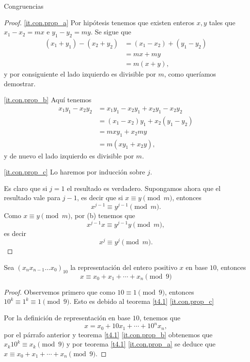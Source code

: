 \begin{section}{Congruencias}
\begin{proof}
\ref{it.con.prop_a} Por hipótesis tenemos que existen enteros
$x,y$ tales que $x_1-x_2=mx$ e $y_1-y_2=my$. Se sigue que
$$
\begin{aligned}
(x_1+y_1)-(x_2+y_2) &= (x_1-x_2)+ (y_1 -y_2) \\
&= mx +my \\
&= m(x+y),
\end{aligned}
$$
y por consiguiente el lado izquierdo es divisible por $m$, como
queríamos demostrar.

\ref{it.con.prop_b} Aquí tenemos
$$
\begin{aligned}
x_1y_1-x_2y_2 &=  x_1y_1-x_2y_1+ x_2y_1-x_2y_2 \\
&= (x_1-x_2)y_1+ x_2(y_1 -y_2) \\
&= mxy_1 +x_2my \\
&= m(xy_1+x_2y),
\end{aligned}
$$
y de nuevo el lado izquierdo es divisible por $m$.

\ref{it.con.prop_c}  Lo haremos por inducción sobre $j$. 

Es claro que si $j=1$ el resultado es verdadero. Supongamos ahora que el resultado vale para $j-1$, es decir que si  $x \equiv y \pmod{m}$, entonces 
$$
x^{j-1} \equiv y^{j-1} \pmod{m}.
$$
Como $x \equiv y \pmod{m}$,  por   { (b)} tenemos que 
$$
x^{j-1}x \equiv y^{j-1}y  \pmod{m},
$$
es decir 
$$
x^j \equiv y^j \pmod{m}.
$$
\end{proof}


\begin{proposicion}\label{prop412}
Sea $(x_nx_{n-1}\ldots x_0)_{10}$ la representación del entero positivo $x$ en base $10$, entonces
$$
x \equiv x_0+x_1+\cdots+x_n \pmod{9}
$$
\end{proposicion}
\begin{proof}
 Observemos primero que como $10\equiv 1\pmod{9}$, entonces  $10^k\equiv 1^k \equiv 1\pmod{9}$. Esto es debido  al teorema \ref{t4.1} \ref{it.con.prop_c} 

Por la definición de representación en base $10$, tenemos que 
$$x=x_0 + 10x_1+ \cdots+10^nx_n,$$ 
por el párrafo anterior y teorema \ref{t4.1} \ref{it.con.prop_b}   obtenemos que $x_k10^k \equiv x_k \pmod{9}$ y por
teorema \ref{t4.1} \ref{it.con.prop_a}  se deduce que $x \equiv
x_0+x_1+\cdots+x_n \pmod{9}$.
\end{proof}


\end{section}
